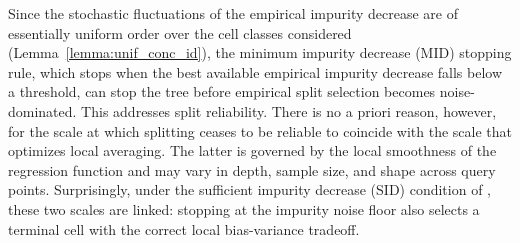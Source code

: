 \documentclass[11pt]{article}
\theoremstyle{plain}
\theoremstyle{definition}
\theoremstyle{remark}
\theoremstyle{plain}
\newcommand{\bx}{\mathbf{x}}
\newcommand{\1}{\mathbbm{1}}
\begin{document}


Since the stochastic fluctuations of the empirical impurity decrease are of essentially uniform order over the cell classes considered (Lemma~\ref{lemma:unif_conc_id}), the minimum impurity decrease (MID) stopping rule, which stops when the best available empirical impurity decrease falls below a threshold, can stop the tree before empirical split selection becomes noise-dominated. This addresses split reliability. 
There is no a priori reason, however, for the scale at which splitting ceases to be reliable to coincide with the scale that optimizes local averaging. The latter is governed by the local smoothness of the regression function and may vary in depth, sample size, and shape across query points. Surprisingly, under the sufficient impurity decrease (SID) condition of \citet{chi2022asymptotic}, these two scales are linked: stopping at the impurity noise floor also selects a terminal cell with the correct local bias-variance tradeoff.
\end{document}
